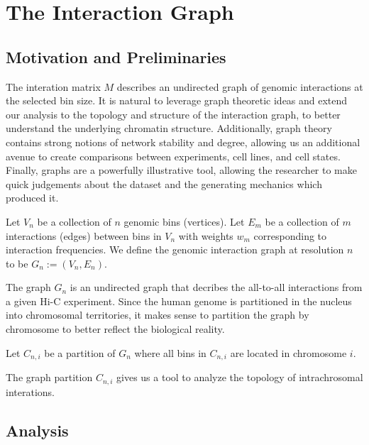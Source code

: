 \documentclass[phd,tocprelim]{cornell}
\begin{document}


\chapter{The Interaction Graph}

\section{Motivation and Preliminaries}

The interation matrix $M$ describes an undirected graph of genomic interactions
at the selected bin size.  It is natural to leverage graph theoretic ideas 
and extend our analysis to the topology and structure of the interaction graph,
to better understand the underlying chromatin structure.  Additionally, graph
theory contains strong notions of network stability and degree, allowing us an
additional avenue to create comparisons between experiments, cell lines, and cell
states.  Finally, graphs are a powerfully illustrative tool, allowing the
researcher to make quick judgements about the dataset and the generating
mechanics which produced it.

\begin{definition}
  Let $V_{n}$ be a collection of $n$ genomic bins (vertices).  Let $E_{m}$ be a
  collection of $m$ interactions (edges) between bins in $V_{n}$ with weights
  $w_{m}$ corresponding to interaction frequencies.  We define the  genomic
  interaction graph at resolution $n$ to be $G_{n} := (V_{n}, E_{n})$.
\end{definition}

The graph $G_{n}$ is an undirected graph that decribes the all-to-all
interactions from a given Hi-C experiment.  Since the human genome is
partitioned in the nucleus into chromosomal territories, it makes sense to
partition the graph by chromosome to better reflect the biological reality.

\begin{definition}
  Let $C_{n,i}$ be a partition of $G_{n}$ where all bins in $C_{n,i}$ are
  located in chromosome $i$.
\end{definition}

The graph partition $C_{n,i}$ gives us a tool to analyze the topology of
intrachrosomal interations.

\section{Analysis}
\end{document}
